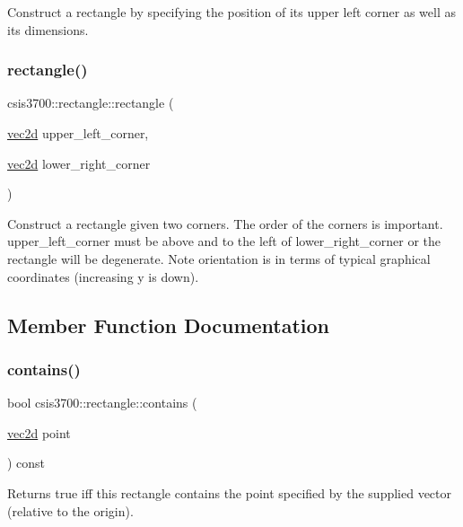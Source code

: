 Construct a rectangle by specifying the position of its upper left corner as well as its dimensions. \mbox{\label{classcsis3700_1_1rectangle_a65e217f0a67f76c2014b34f5995c689d}} 
\subsubsection{\texorpdfstring{rectangle()}{rectangle()}\hspace{0.1cm}{\footnotesize\ttfamily [3/3]}}
{\footnotesize\ttfamily csis3700\+::rectangle\+::rectangle (\begin{DoxyParamCaption}\item[{\hyperlink{classcsis3700_1_1vec2d}{vec2d}}]{upper\+\_\+left\+\_\+corner,  }\item[{\hyperlink{classcsis3700_1_1vec2d}{vec2d}}]{lower\+\_\+right\+\_\+corner }\end{DoxyParamCaption})}

Construct a rectangle given two corners. The order of the corners is important. upper\+\_\+left\+\_\+corner must be above and to the left of lower\+\_\+right\+\_\+corner or the rectangle will be degenerate. Note orientation is in terms of typical graphical coordinates (increasing y is down). 

\subsection{Member Function Documentation}
\mbox{\label{classcsis3700_1_1rectangle_a15d2ad3f67159bd7724a3728203b1f29}} 
\subsubsection{\texorpdfstring{contains()}{contains()}}
{\footnotesize\ttfamily bool csis3700\+::rectangle\+::contains (\begin{DoxyParamCaption}\item[{\hyperlink{classcsis3700_1_1vec2d}{vec2d}}]{point }\end{DoxyParamCaption}) const}

Returns true iff this rectangle contains the point specified by the supplied vector (relative to the origin). \mbox{\label{classcsis3700_1_1rectangle_ae6306167ac675bdf07cf3a834f1148ae}} 
